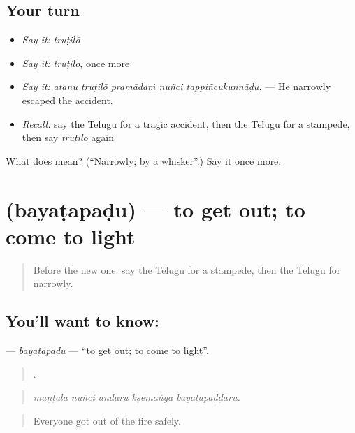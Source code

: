 \subsection*{Your turn}
\begin{itemize}
\raggedright
  \item \emph{Say it:} \emph{truṭilō}
  \item \emph{Say it:} \emph{truṭilō}, once more
  \item \emph{Say it:} \emph{atanu truṭilō pramādaṁ nuñci tappiñcukunnāḍu.} — He narrowly escaped the accident.
  \item \emph{Recall:} say the Telugu for a tragic accident, then the Telugu for a stampede, then say \emph{truṭilō} again
\end{itemize}

\begin{tcolorbox}[breakable,colback=teal!4,colframe=teal!35!black,title={Before you move on}]
What does  mean? (\textquotedblleft{}Narrowly; by a whisker\textquotedblright{}.) Say it once more.
\end{tcolorbox}
\section[\texorpdfstring{\te{బయటపడు} (bayaṭapaḍu)}{బయటపడు (bayaṭapaḍu)}]{ (bayaṭapaḍu) — to get out; to come to light}

\label{lesson:TE-C343-bayatapadu}



\begin{quote}
Before the new one: say the Telugu for a stampede, then the Telugu for narrowly.
\end{quote}

\subsection*{You'll want to know: }
\textbf{} — \emph{bayaṭapaḍu} — \textquotedblleft{}to get out; to come to light\textquotedblright{}.

\begin{quote}
    .
\end{quote}

\begin{quote}
\emph{maṇṭala nuñci andarū kṣēmaṅgā bayaṭapaḍḍāru.}
\end{quote}

\begin{quote}
Everyone got out of the fire safely.
\end{quote}


